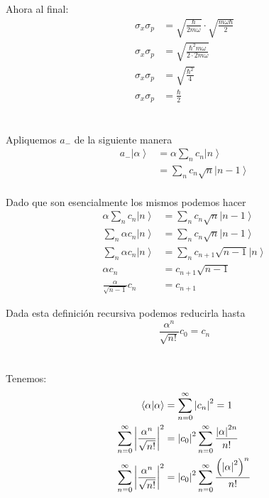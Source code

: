 \documentclass{report}
\newcommand{\inangle}[1]{\langle#1\rangle}
\begin{document}
Ahora al final:
\begin{align*}
  \sigma_x\sigma_p &= \sqrt{\frac{\hbar}{2m\omega}} \cdot \sqrt{\frac{m\omega\hbar}{2}}\\
  \sigma_x\sigma_p &= \sqrt{\frac{\hbar^2 m\omega}{2\cdot2m\omega}}\\
  \sigma_x\sigma_p &= \sqrt{\frac{\hbar^2}{4}}\\
  \sigma_x\sigma_p &= \frac{\hbar}{2}
\end{align*}

\pagebreak

\section{}

Apliquemos $a_-$ de la siguiente manera
\begin{align*}
  a_-\left| \alpha \right> &= \alpha \sum_{n} c_n \left| n \right>\\
  &= \sum_{n} c_n \sqrt{n} \left| n - 1 \right>\\
\end{align*}

Dado que son esencialmente los mismos podemos hacer
\begin{align*}
  \alpha \sum_{n} c_n \left| n \right> &= \sum_{n} c_n \sqrt{n} \left| n - 1 \right>\\
  \sum_{n} \alpha c_n \left| n \right> &= \sum_{n} c_n \sqrt{n} \left| n - 1 \right>\\
  \sum_{n} \alpha c_n \left| n \right> &= \sum_{n} c_{n + 1} \sqrt{n - 1} \left| n \right>\\
  \alpha c_n &= c_{n + 1} \sqrt{n - 1}\\
  \frac{\alpha}{\sqrt{n - 1}} c_n &= c_{n + 1}
\end{align*}

Dada esta definición recursiva podemos reducirla hasta
\[
  \frac{\alpha^n}{\sqrt{n!}} c_0 = c_{n}
\]

\section{}

Tenemos:
\begin{align*}
  \inangle{\alpha | \alpha} &= \sum_{n = 0}^{\infty} \left|c_n\right|^2 = 1\\
  \sum_{n = 0}^{\infty} \left|\frac{\alpha^n}{\sqrt{n!}}\right|^2 &= \left|c_0\right|^2 \sum_{n = 0}^{\infty} \frac{\left|\alpha\right|^{2n}}{n!}\\
  \sum_{n = 0}^{\infty} \left|\frac{\alpha^n}{\sqrt{n!}}\right|^2 &= \left|c_0\right|^2 \sum_{n = 0}^{\infty} \frac{\paren{\left|\alpha\right|^{2}}^n}{n!}
\end{align*}
\end{document}
